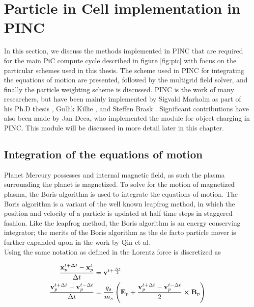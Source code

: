 \section{Particle in Cell implementation in PINC}
In this section, we discuss the methods implemented in PINC that are required for the main PiC compute cycle described in figure \ref{fig:pic} with focus on the particular schemes used in this thesis. The scheme used in PINC for integrating the equations of motion are presented, followed by the multigrid field solver, and finally the particle weighting scheme is discussed. PINC is the work of many researchers, but have been mainly implemented by Sigvald Marholm as part of his Ph.D thesis , Gullik Killie , and Steffen Brask . Significant contributions have also been made by Jan Deca, who implemented the module for object charging in PINC. This module will be discussed in more detail later in this chapter. 

\subsection{Integration of the equations of motion}
Planet Mercury possesses and internal magnetic field, as such the plasma surrounding the planet is magnetized. To solve for the motion of magnetized plasma, the Boris algorithm is used to integrate the equations of motion. The Boris algorithm is a variant of the well known leapfrog method, in which the position and velocity of a particle is updated at half time steps in staggered fashion. Like the leapfrog method, the Boris algorithm is an energy conserving integrator; the merits of the Boris algorithm as the de facto particle mover is further expanded upon in the work by Qin et al. 
\\
Using the same notation as defined in  the Lorentz force is discretized as 

\begin{subequations}
    \begin{align}
        \frac{\vb{x}^{t+\Delta t}_p - \vb{x}^t_p}{\Delta t} &= \vb{v}^{t + \frac{\Delta t}{2}} \\
        \frac{\vb{v}^{t+\Delta t}_p - \vb{v}^{t-\Delta t}_p}{\Delta t} &= \frac{q_s}{m_s} \left(\vb{E}_p + \frac{\vb{v}^{t+\Delta t}_p - \vb{v}^{t-\Delta t}_p}{2} \cross \vb{B}_p \right) \label{eq:borizVel}
    \end{align}
\end{subequations}

